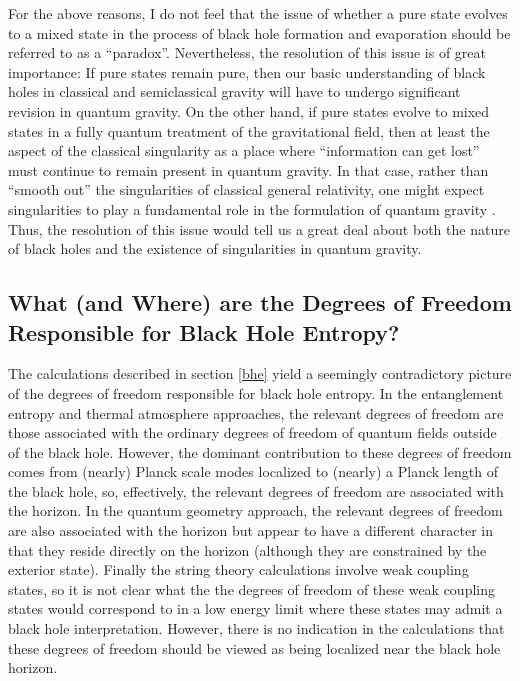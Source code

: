 For the above reasons, I do not feel that the issue of whether a pure
state evolves to a mixed state in the process of black hole formation
and evaporation should be referred to as a ``paradox''. Nevertheless,
the resolution of this issue is of great importance: If pure states
remain pure, then our basic understanding of black holes in classical
and semiclassical gravity will have to undergo significant revision in
quantum gravity. On the other hand, if pure states evolve to mixed
states in a fully quantum treatment of the gravitational field, then
at least the aspect of the classical singularity as a place where
``information can get lost'' must continue to remain present in
quantum gravity. In that case, rather than ``smooth out'' the
singularities of classical general relativity, one might expect
singularities to play a fundamental role in the formulation of quantum
gravity \cite{p}. Thus, the resolution of this issue would tell us a
great deal about both the nature of black holes and the existence of
singularities in quantum gravity.

\subsection{What (and Where) are the Degrees of Freedom Responsible for 
Black Hole Entropy?}
\label{dof}

The calculations described in section \ref{bhe} yield a seemingly
contradictory picture of the degrees of freedom responsible for black
hole entropy. In the entanglement entropy and thermal atmosphere
approaches, the relevant degrees of freedom are those associated with
the ordinary degrees of freedom of quantum fields outside of the black
hole. However, the dominant contribution to these degrees of freedom
comes from (nearly) Planck scale modes localized to (nearly) a Planck
length of the black hole, so, effectively, the relevant degrees of
freedom are associated with the horizon. In the quantum geometry
approach, the relevant degrees of freedom are also associated with the
horizon but appear to have a different character in that they reside
directly on the horizon (although they are constrained by the exterior
state). Finally the string theory calculations involve weak coupling
states, so it is not clear what the the degrees of
freedom of these weak coupling states would correspond to in a low
energy limit where these states may admit a black hole
interpretation. However, there is no indication in the calculations
that these degrees of freedom should be viewed as being localized near
the black hole horizon.

